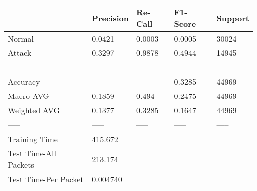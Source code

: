 \begin{tabular}{lllll}
\toprule
{} & Precision & Re-Call & F1-Score & Support \\
\midrule
Normal                &    0.0421 &  0.0003 &   0.0005 &   30024 \\
Attack                &    0.3297 &  0.9878 &   0.4944 &   14945 \\
-----                 &     ----- &   ----- &    ----- &   ----- \\
Accuracy              &           &         &   0.3285 &   44969 \\
Macro AVG             &    0.1859 &   0.494 &   0.2475 &   44969 \\
Weighted AVG          &    0.1377 &  0.3285 &   0.1647 &   44969 \\
-----                 &     ----- &   ----- &    ----- &   ----- \\
Training Time         &   415.672 &   ----- &    ----- &   ----- \\
Test Time-All Packets &   213.174 &   ----- &    ----- &   ----- \\
Test Time-Per Packet  &  0.004740 &   ----- &    ----- &   ----- \\
\bottomrule
\end{tabular}
